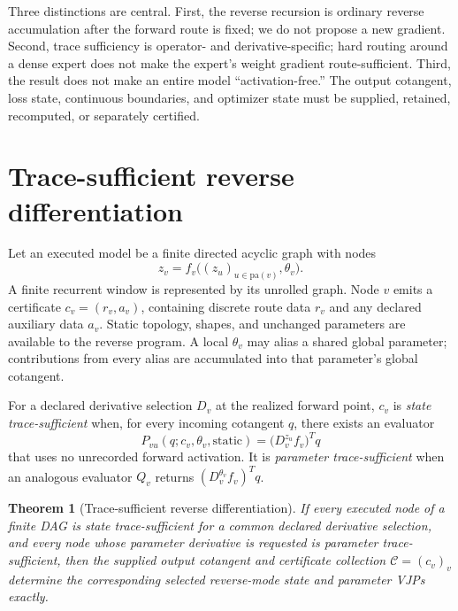 \documentclass[10pt]{article}
\newtheorem{theorem}{Theorem}
\newcommand{\cert}{\mathcal{C}}
\begin{document}
Three distinctions are central.  First, the reverse recursion is ordinary
reverse accumulation after the forward route is fixed; we do not propose a new
gradient.  Second, trace sufficiency is operator- and derivative-specific;
hard routing around a dense expert does not make the expert's weight gradient
route-sufficient.  Third, the result does not make an entire model
``activation-free.''  The output cotangent, loss state, continuous boundaries,
and optimizer state must be supplied, retained, recomputed, or separately
certified.

\section{Trace-sufficient reverse differentiation}

Let an executed model be a finite directed acyclic graph with nodes
\begin{equation}
 z_v=f_v\big((z_u)_{u\in\mathrm{pa}(v)},\theta_v\big).
\end{equation}
A finite recurrent window is represented by its unrolled graph.  Node $v$
emits a certificate $c_v=(r_v,a_v)$, containing discrete route data $r_v$ and
any declared auxiliary data $a_v$.  Static topology, shapes, and unchanged
parameters are available to the reverse program.  A local $\theta_v$ may alias
a shared global parameter; contributions from every alias are accumulated into
that parameter's global cotangent.

For a declared derivative selection $D_v$ at the realized forward point,
$c_v$ is \emph{state trace-sufficient} when, for every incoming cotangent $q$,
there exists an evaluator
\begin{equation}
 P_{vu}(q;c_v,\theta_v,\mathrm{static})
 =\big(D_v^{z_u}f_v\big)^Tq
\end{equation}
that uses no unrecorded forward activation.  It is \emph{parameter
trace-sufficient} when an analogous evaluator $Q_v$ returns
$(D_v^{\theta_v}f_v)^Tq$.

\begin{theorem}[Trace-sufficient reverse differentiation]
If every executed node of a finite DAG is state trace-sufficient for a common
declared derivative selection, and every node whose parameter derivative is
requested is parameter trace-sufficient, then the supplied output cotangent
and certificate collection $\cert=(c_v)_v$ determine the corresponding
selected reverse-mode state and parameter VJPs exactly.
\end{theorem}
\end{document}
